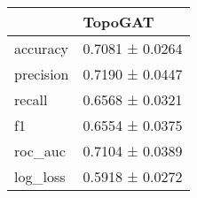 \begin{tabular}{ll}
\toprule
 & TopoGAT \\
\midrule
accuracy & 0.7081 ± 0.0264 \\
precision & 0.7190 ± 0.0447 \\
recall & 0.6568 ± 0.0321 \\
f1 & 0.6554 ± 0.0375 \\
roc_auc & 0.7104 ± 0.0389 \\
log_loss & 0.5918 ± 0.0272 \\
\bottomrule
\end{tabular}
